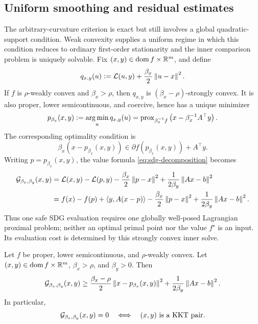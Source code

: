 \subsection{Uniform smoothing and residual estimates}

The arbitrary-curvature criterion is exact but still involves a global
quadratic-support condition.  Weak convexity supplies a uniform regime in
which this condition reduces to ordinary first-order stationarity and the
inner comparison problem is uniquely solvable.  Fix
\((x,y)\in\operatorname{dom}f\times\mathbb{R}^m\), and define
\[
  q_{x,y}(u)
  :=\mathcal{L}(u,y)+\frac{\beta_x}{2}\left\lVert u-x\right\rVert^2.
\]
If \(f\) is \(\rho\)-weakly convex and \(\beta_x>\rho\), then
\(q_{x,y}\) is \((\beta_x-\rho)\)-strongly convex.  It is also proper,
lower semicontinuous, and coercive, hence has a unique minimizer
\begin{equation}
  p_{\beta_x}(x,y)
  :=
  \operatorname*{arg\,min}_u q_{x,y}(u)
  =
  \operatorname{prox}_{\beta_x^{-1}f}
     \left(x-\beta_x^{-1}A^\top y\right).
  \label{eq:lagrangian-prox}
\end{equation}
The corresponding optimality condition is
\begin{equation}
  \beta_x(x-p_{\beta_x}(x,y))
  \in
  \partial f(p_{\beta_x}(x,y))+A^\top y.
  \label{eq:lagrangian-prox-optimality}
\end{equation}
Writing \(p=p_{\beta_x}(x,y)\), the value formula
\cref{eq:sdg-decomposition} becomes
\begin{equation}
  \begin{split}
  \mathcal{G}_{\beta_x,\beta_y}(x,y)
  &=
  \mathcal{L}(x,y)-\mathcal{L}(p,y)
  -\frac{\beta_x}{2}\left\lVert p-x\right\rVert^{2}
  +\frac{1}{2\beta_y}\left\lVert Ax-b\right\rVert^{2}\\
  &=
  f(x)-f(p)+\left\langle y,A(x-p)\right\rangle
  -\frac{\beta_x}{2}\left\lVert p-x\right\rVert^{2}
  +\frac{1}{2\beta_y}\left\lVert Ax-b\right\rVert^{2}.
  \end{split}
  \label{eq:safe-sdg-prox-formula}
\end{equation}
Thus one safe SDG evaluation requires one globally well-posed Lagrangian
proximal problem; neither an optimal primal point nor the value \(f^\star\) is
an input.  Its evaluation cost is determined by this strongly convex inner
solve.

\begin{theorem}
  \label{thm:safe-zero-set}
  Let \(f\) be proper, lower semicontinuous, and \(\rho\)-weakly convex.
  Let \((x,y)\in\operatorname{dom}f\times\mathbb{R}^m\),
  \(\beta_x>\rho\), and \(\beta_y>0\).  Then
  \begin{equation}
    \mathcal{G}_{\beta_x,\beta_y}(x,y)
    \ge
    \frac{\beta_x-\rho}{2}
       \left\lVert x-p_{\beta_x}(x,y)\right\rVert^2
    +\frac{1}{2\beta_y}\left\lVert Ax-b\right\rVert^2.
    \label{eq:safe-lower-bound}
  \end{equation}
  In particular,
  \begin{equation}
    \mathcal{G}_{\beta_x,\beta_y}(x,y)=0
    \quad\Longleftrightarrow\quad
    (x,y)\ \text{is a KKT pair}.
    \label{eq:safe-equivalence}
  \end{equation}
\end{theorem}

